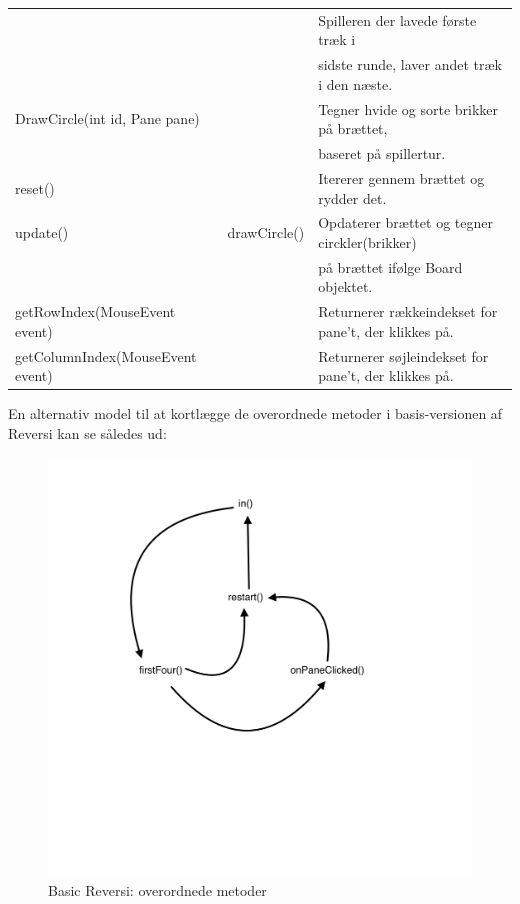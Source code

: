 \begin{table}[H]
\begin{tabular}{lll}
                                                  &                   & Spilleren der lavede første træk i                   \\
                                                  &                   & sidste runde, laver andet træk i den næste.          \\
        DrawCircle(int id, Pane pane)             &                   & Tegner hvide og sorte brikker på brættet,            \\
                                                  &                   & baseret på spillertur.                               \\
        reset()                                   &                   & Itererer gennem brættet og rydder det.               \\
        update()                                  & drawCircle()      & Opdaterer brættet og tegner circkler(brikker)        \\
                                                  &                   & på brættet ifølge Board objektet.                    \\
        getRowIndex(MouseEvent event)             &                   & Returnerer rækkeindekset for pane't, der klikkes på. \\
        getColumnIndex(MouseEvent event)          &                   & Returnerer søjleindekset for pane't, der klikkes på. \\
        \bottomrule
    \end{tabular}
\end{table}
En alternativ model til at kortlægge de overordnede metoder i basis-versionen af Reversi kan se således ud:
\begin{figure}[H]
    \centering
    \caption{Basic Reversi: overordnede metoder}\label{BRF}
    \includegraphics[width=1\textwidth]{Graphics/Basis.png}
\end{figure}
